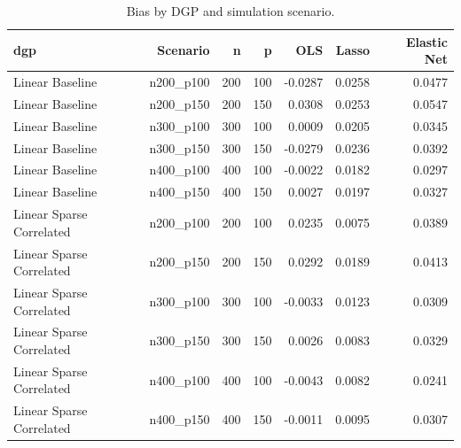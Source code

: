 \begin{table}[!htbp]
\centering
\caption{Bias by DGP and simulation scenario.}
\label{tab:bias-1}
\begin{tabular}{lrrrrrr}
 \hline
dgp & Scenario & n & p & OLS & Lasso & Elastic Net \\
 \hline
Linear Baseline & n200\_p100 & 200 & 100 & -0.0287 & 0.0258 & 0.0477 \\
Linear Baseline & n200\_p150 & 200 & 150 & 0.0308 & 0.0253 & 0.0547 \\
Linear Baseline & n300\_p100 & 300 & 100 & 0.0009 & 0.0205 & 0.0345 \\
Linear Baseline & n300\_p150 & 300 & 150 & -0.0279 & 0.0236 & 0.0392 \\
Linear Baseline & n400\_p100 & 400 & 100 & -0.0022 & 0.0182 & 0.0297 \\
Linear Baseline & n400\_p150 & 400 & 150 & 0.0027 & 0.0197 & 0.0327 \\
Linear Sparse Correlated & n200\_p100 & 200 & 100 & 0.0235 & 0.0075 & 0.0389 \\
Linear Sparse Correlated & n200\_p150 & 200 & 150 & 0.0292 & 0.0189 & 0.0413 \\
Linear Sparse Correlated & n300\_p100 & 300 & 100 & -0.0033 & 0.0123 & 0.0309 \\
Linear Sparse Correlated & n300\_p150 & 300 & 150 & 0.0026 & 0.0083 & 0.0329 \\
Linear Sparse Correlated & n400\_p100 & 400 & 100 & -0.0043 & 0.0082 & 0.0241 \\
Linear Sparse Correlated & n400\_p150 & 400 & 150 & -0.0011 & 0.0095 & 0.0307 \\
 \hline
\end{tabular}
\end{table}


